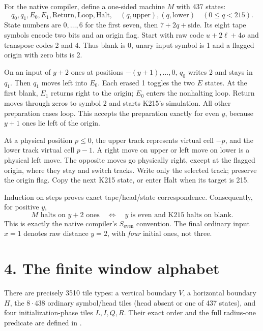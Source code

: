 \documentclass[10pt]{article}
\begin{document}
For the native compiler, define a one-sided machine $M$ with 437 states:
\[
q_0,q_1,E_0,E_1,\mathrm{Return},\mathrm{Loop},\mathrm{Halt},
\quad(q,\mathrm{upper}),(q,\mathrm{lower})\quad(0\le q<215).
\]
State numbers are $0,\ldots,6$ for the first seven, then $7+2q+\mathrm{side}$. Its eight tape symbols encode two bits and an origin flag. Start with raw code $u+2\ell+4o$ and transpose codes 2 and 4. Thus blank is 0, unary input symbol is 1 and a flagged origin with zero bits is 2.

On an input of $y+2$ ones at positions $-(y+1),\ldots,0$, $q_0$ writes 2 and stays in $q_1$. Then $q_1$ moves left into $E_0$. Each erased 1 toggles the two $E$ states. At the first blank, $E_1$ returns right to the origin; $E_0$ enters the nonhalting loop. Return moves through zeros to symbol 2 and starts K215's simulation. All other preparation cases loop. This accepts the preparation exactly for even $y$, because $y+1$ ones lie left of the origin.

At a physical position $p\le0$, the upper track represents virtual cell $-p$, and the lower track virtual cell $p-1$. A right move on upper or left move on lower is a physical left move. The opposite moves go physically right, except at the flagged origin, where they stay and switch tracks. Write only the selected track; preserve the origin flag. Copy the next K215 state, or enter Halt when its target is 215.

Induction on steps proves exact tape/head/state correspondence. Consequently, for positive $y$,
\[
M\text{ halts on }y+2\text{ ones}
\quad\Longleftrightarrow\quad
y\text{ is even and K215 halts on blank}.
\]
This is exactly the native compiler's $S_{\mathrm{even}}$ convention. The final ordinary input $x=1$ denotes raw distance $y=2$, with \emph{four} initial ones, not three.

\section*{4. The finite window alphabet}
There are precisely 3510 tile types: a vertical boundary $V$, a horizontal boundary $H$, the $8\cdot438$ ordinary symbol/head tiles (head absent or one of 437 states), and four initialization-phase tiles $L,I,Q,R$. Their exact order and the full radius-one predicate are defined in .
\end{document}
